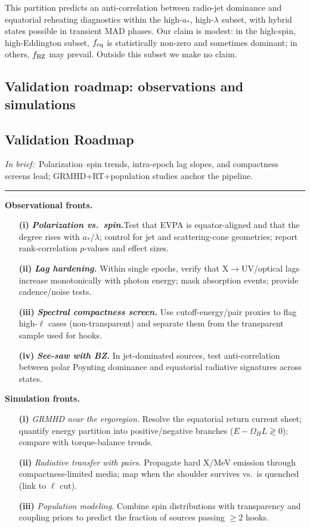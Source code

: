 \documentclass[twocolumn]{aastex701}
\DeclareRobustCommand{\tldr}[1]{%
  \noindent\textit{In brief:}~#1%
  \par\smallskip
  \noindent\rule{\columnwidth}{0.2pt}\par\medskip
}
\begin{document}
This partition predicts an anti-correlation between radio-jet dominance and equatorial reheating diagnostics within the high-$a_*$, high-$\lambda$ subset, with hybrid states possible in transient MAD phases.
Our claim is modest: in the high-spin, high-Eddington subset, $f_{\rm eq}$ is statistically non-zero and sometimes dominant; in others, $f_{\rm BZ}$ may prevail. Outside this subset we make no claim.

\subsection*{Validation roadmap: observations and simulations}
\subsection{Validation Roadmap}\label{sec:roadmap}
\tldr{Polarization--spin trends, intra-epoch lag slopes, and compactness screens lead; GRMHD+RT+population studies anchor the pipeline.}

\noindent\textbf{Observational fronts.}
\begin{enumerate}
  \item[\textbf{(i)}] \textit{\textbf{Polarization vs.\ spin.}}Test that EVPA is equator-aligned and that the degree rises with $a_\ast$/$\lambda$; control for jet and scattering-cone geometries; report rank-correlation $p$-values and effect sizes.
  \item[\textbf{(ii)}] \textit{\textbf{Lag hardening.}} Within single epochs, verify that X$\to$UV/optical lags increase monotonically with photon energy; mask absorption events; provide cadence/noise tests.
  \item[\textbf{(iii)}] \textit{\textbf{Spectral compactness screen.}} Use cutoff-energy/pair proxies to flag high-$\ell$ cases (non-transparent) and separate them from the transparent sample used for hooks.
  \item[\textbf{(iv)}] \textit{\textbf{See-saw with BZ.}} In jet-dominated sources, test anti-correlation between polar Poynting dominance and equatorial radiative signatures across states.
\end{enumerate}

\noindent\textbf{Simulation fronts.}
\begin{enumerate}
  \item[\textbf{(i)}] \textit{GRMHD near the ergoregion.} Resolve the equatorial return current sheet; quantify energy partition into positive/negative branches ($E-\Omega_H L\gtrless 0$); compare with torque-balance trends.
  \item[\textbf{(ii)}] \textit{Radiative transfer with pairs.} Propagate hard X/MeV emission through compactness-limited media; map when the shoulder survives vs.\ is quenched (link to $\ell$ cut).
  \item[\textbf{(iii)}] \textit{Population modeling.} Combine spin distributions with transparency and coupling priors to predict the fraction of sources passing $\ge 2$ hooks.
\end{enumerate}
\end{document}
